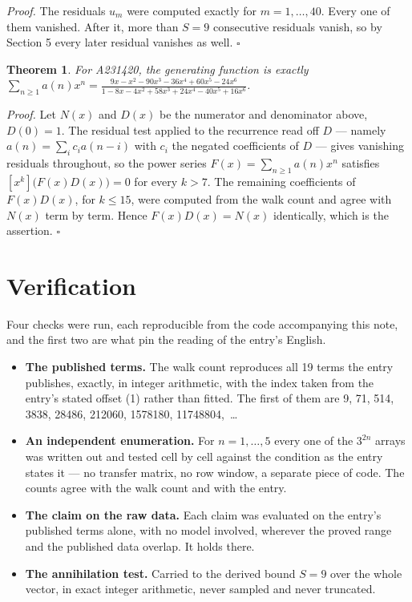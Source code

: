 \documentclass[11pt]{article}
\newtheorem{theorem}{Theorem}
\theoremstyle{definition}
\begin{document}
{\itshape Proof.} The residuals $u_m$ were computed exactly for $m = 1,\dots,40$. Every one of them vanished. After it, more than $S = 9$ consecutive residuals vanish, so by Section 5 every later residual vanishes as well. $\square$

\begin{theorem} For A231420, the generating function is exactly $\sum_{n\ge 1} a(n)x^n = \frac{9x - x^{2} - 90x^{3} - 36x^{4} + 60x^{5} - 24x^{6}}{1 - 8x - 4x^{2} + 58x^{3} + 24x^{4} - 40x^{5} + 16x^{6}}$.\end{theorem}

{\itshape Proof.} Let $N(x)$ and $D(x)$ be the numerator and denominator above, $D(0)=1$. The residual test applied to the recurrence read off $D$ --- namely $a(n) = \sum_i c_i a(n-i)$ with $c_i$ the negated coefficients of $D$ --- gives vanishing residuals throughout, so the power series $F(x)=\sum_{n\ge 1}a(n)x^n$ satisfies $[x^k]\bigl(F(x)D(x)\bigr) = 0$ for every $k > 7$. The remaining coefficients of $F(x)D(x)$, for $k \le 15$, were computed from the walk count and agree with $N(x)$ term by term. Hence $F(x)D(x) = N(x)$ identically, which is the assertion. $\square$

\section{Verification}

Four checks were run, each reproducible from the code accompanying this note, and the first two are what pin the reading of the entry's English.

\begin{itemize}

\item {\bfseries The published terms.} The walk count reproduces all 19 terms the entry publishes, exactly, in integer arithmetic, with the index taken from the entry's stated offset (1) rather than fitted. The first of them are 9, 71, 514, 3838, 28486, 212060, 1578180, 11748804,~\dots

\item {\bfseries An independent enumeration.} For $n = 1,\dots,5$ every one of the $3^{2n}$ arrays was written out and tested cell by cell against the condition as the entry states it --- no transfer matrix, no row window, a separate piece of code. The counts agree with the walk count and with the entry.

\item {\bfseries The claim on the raw data.} Each claim was evaluated on the entry's published terms alone, with no model involved, wherever the proved range and the published data overlap. It holds there.

\item {\bfseries The annihilation test.} Carried to the derived bound $S = 9$ over the whole vector, in exact integer arithmetic, never sampled and never truncated.

\end{itemize}
\end{document}

